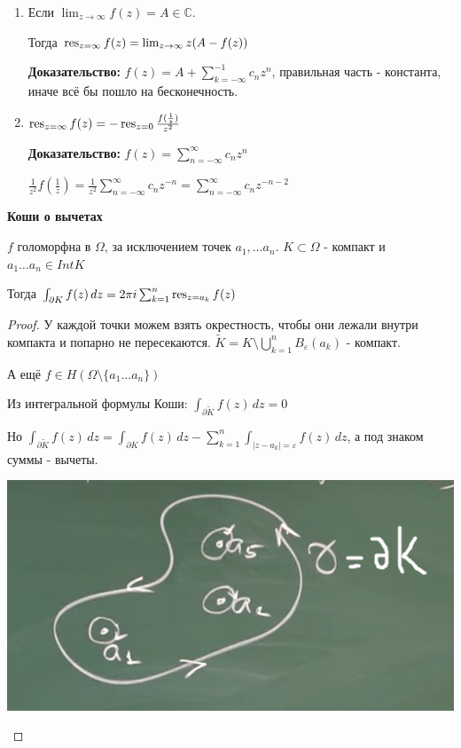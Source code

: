 \begin{properties}
\begin{enumerate}
        \item Если $\lim_{z \to \infty} f(z) = A \in \mathbb{C}$.

        Тогда $\operatorname{res}_{z = \infty} f(z) = \lim_{z \to \infty} z (A - f(z))$

        \textbf{Доказательство:} $f(z) = A + \sum_{k = -\infty}^{-1} c_nz^n$, правильная часть - константа,
        иначе всё бы пошло на бесконечность.

        \item $\operatorname{res}_{z = \infty} f(z) = -\operatorname{res}_{z = 0} \frac{f(\frac{1}{z})}{z^2}$

        \textbf{Доказательство:} $f(z) = \sum_{n = -\infty}^{\infty} c_nz^n$

        $\frac{1}{z^2} f(\frac{1}{z}) = \frac{1}{z^2} \sum_{n = -\infty}^{\infty} c_nz^{-n} =
        \sum_{n = -\infty}^{\infty} c_nz^{-n - 2}$
    \end{enumerate}
\end{properties}

\begin{theorem}
    \textbf{Коши о вычетах}

    $f$ голоморфна в $\Omega$, за исключением точек $a_1, \ldots a_n$.
    $K \subset \Omega$ - компакт и $a_1 \ldots a_n \in Int K$

    Тогда $\int_{\partial K} f(z) \, dz = 2\pi i \sum_{k = 1}^n \operatorname{res}_{z = a_k} f(z)$
\end{theorem}

\begin{proof}

    У каждой точки можем взять окрестность, чтобы они лежали внутри компакта и
    попарно не пересекаются. $\widetilde{K} = K \setminus \bigcup_{k = 1}^n B_{\varepsilon} (a_k)$ - компакт.

    А ещё $f \in H(\Omega \setminus \{ a_1 \ldots a_n\} )$

    Из интегральной формулы Коши: $\int_{\partial \widetilde{K}} f(z) \, dz = 0$

    Но $\int_{\partial \widetilde{K}} f(z) \, dz = \int_{\partial K} f(z) \, dz - \sum_{k = 1}^n \int_{|z - a_k| = \varepsilon} f(z) \, dz$, а
    под знаком суммы - вычеты.


    \begin{center}
        \includegraphics{assets/04-functions-of-complex-variables/koshi-theorem-for-deductions.png}
    \end{center}
\end{proof}

